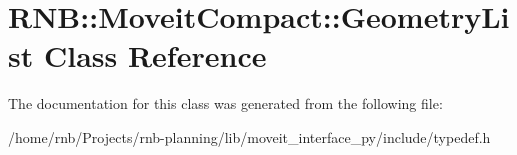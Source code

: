 \hypertarget{class_r_n_b_1_1_moveit_compact_1_1_geometry_list}{}\section{R\+NB\+:\+:Moveit\+Compact\+:\+:Geometry\+List Class Reference}
\label{class_r_n_b_1_1_moveit_compact_1_1_geometry_list}


The documentation for this class was generated from the following file\+:\begin{DoxyCompactItemize}
\item 
/home/rnb/\+Projects/rnb-\/planning/lib/moveit\+\_\+interface\+\_\+py/include/typedef.\+h\end{DoxyCompactItemize}
